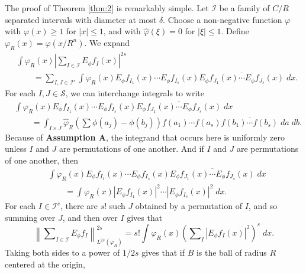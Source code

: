 \documentclass[12pt]{article}
\begin{document}
The proof of Theorem \ref{thm:2} is remarkably simple. Let $\mathcal{I}$ be a family of $C/R$ separated intervals with diameter at most $\delta$. Choose a non-negative function $\varphi$ with $\varphi(x) \geq 1$ for $|x| \leq 1$, and with $\widehat{\varphi}(\xi) = 0$ for $|\xi| \leq 1$. Define $\varphi_R(x) = \varphi(x/R^n)$. We expand
%
\begin{equation}
\begin{split}
    &\int \varphi_R(x) \left|\sum\nolimits_{I \in \mathcal{I}} E_\phi f_I(x) \right|^{2s}\\
    &\quad\quad = \sum_{I,J \in \mathcal{I}^s} \int \varphi_R(x) E_\phi f_{I_1}(x) \cdots E_\phi f_{I_s}(x) \overline{E_\phi f_{J_1}(x) \cdots E_\phi f_{J_s}(x)}\; dx.
\end{split}
\end{equation}
%
For each $I,J \in \mathcal{S}$, we can interchange integrals to write
%
\begin{equation}
\begin{split}
    &\int \varphi_R(x) E_\phi f_{I_1}(x) \cdots E_\phi f_{I_s}(x) \overline{E_\phi f_{J_1}(x) \cdots E_\phi f_{J_s}(x)}\; dx\\
    &\quad\quad = \int_{I \times J} \widehat{\varphi}_R \left( \sum \phi(a_j) - \phi(b_j) \right) f(a_1) \cdots f(a_s) \overline{f(b_1) \cdots f(b_s)}\; da\; db.
\end{split}
\end{equation}
%
Because of \textbf{Assumption A}, the integrand that occurs here is uniformly zero unless $I$ and $J$ are permutations of one another. And if $I$ and $J$ are permutations of one another, then
%
\begin{equation}
\begin{split}
    &\int \varphi_R(x) E_\phi f_{I_1}(x) \cdots E_\phi f_{I_s}(x) \overline{E_\phi f_{J_1}(x) \cdots E_\phi f_{J_s}(x)}\; dx\\
    &\quad\quad = \int \varphi_R(x) |E_\phi f_{I_1}(x)|^2 \cdots |E_\phi f_{I_s}(x)|^2\; dx.
\end{split}
\end{equation}
%
For each $I \in \mathcal{I}^s$, there are $s!$ such $J$ obtained by a permutation of $I$, and so summing over $J$, and then over $I$ gives that
%
\begin{equation}
    \left\| \sum\nolimits_{I \in \mathcal{I}} E_\phi f_I \right\|_{L^{2s}(\varphi_R)}^{2s} = s! \int \varphi_R(x) \left( \sum\nolimits_I |E_\phi f_I(x)|^2 \right)^s\; dx.
\end{equation}
%
Taking both sides to a power of $1/2s$ gives that if $B$ is the ball of radius $R$ centered at the origin,
\end{document}
